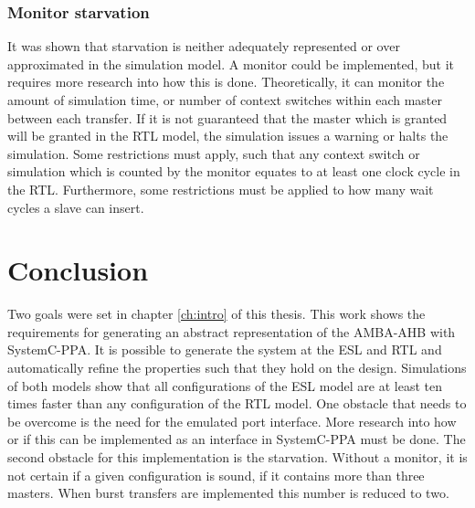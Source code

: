 \subsubsection{Monitor starvation}
It was shown that starvation is neither adequately represented or over approximated in the simulation model. A monitor could be implemented, but it requires more research into how this is done. Theoretically, it can monitor the amount of simulation time, or number of context switches within each master between each transfer. If it is not guaranteed that the master which is granted will be granted in the RTL model, the simulation issues a warning or halts the simulation. Some restrictions must apply, such that any context switch or simulation which is counted by the monitor equates to at least one clock cycle in the RTL. Furthermore, some restrictions must be applied to how many wait cycles a slave can insert.    


\section{Conclusion}
\label{sec:concl}
Two goals were set in chapter \ref{ch:intro} of this thesis. This work shows the requirements for generating an abstract representation of the AMBA-AHB with SystemC-PPA. It is possible to generate the system at the ESL and RTL and automatically refine the properties such that they hold on the design. Simulations of both models show that all configurations of the ESL model are at least ten times faster than any configuration of the RTL model. One obstacle that needs to be overcome is the need for the emulated port interface. More research into how or if this can be implemented as an interface in SystemC-PPA must be done. The second obstacle for this implementation is the starvation. Without a monitor, it is not certain if a given configuration is sound, if it contains more than three masters. When burst transfers are implemented this number is reduced to two. 





     



